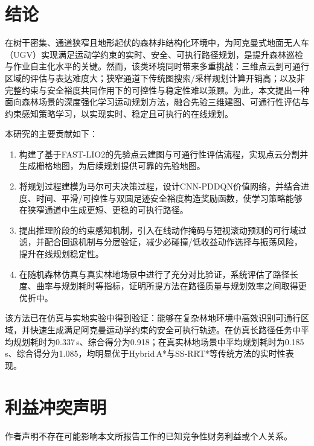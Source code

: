 \documentclass{iopjournal}
\begin{document}
\section{结论}\label{sec:conclusion}

在树干密集、通道狭窄且地形起伏的森林非结构化环境中，为阿克曼式地面无人车（UGV）实现满足运动学约束的实时、安全、可执行路径规划，是提升森林巡检与作业自主化水平的关键。然而，该类环境同时带来多重挑战：三维点云到可通行区域的评估与表达难度大；狭窄通道下传统图搜索/采样规划计算开销高；以及非完整约束与安全裕度共同作用下的可控性与稳定性难以兼顾。为此，本文提出一种面向森林场景的深度强化学习运动规划方法，融合先验三维建图、可通行性评估与约束感知策略学习，以实现实时、稳定且可执行的在线规划。

本研究的主要贡献如下：

\begin{enumerate}
  \item 构建了基于FAST-LIO2的先验点云建图与可通行性评估流程，实现点云分割并生成栅格地图，为后续规划提供可靠的先验地图。
  \item 将规划过程建模为马尔可夫决策过程，设计CNN-PDDQN价值网络，并结合进度、时间、平滑/可控性与双圆足迹安全裕度构造奖励函数，使学习策略能够在狭窄通道中生成更短、更稳的可执行路径。
  \item 提出推理阶段的约束感知机制，引入在线动作掩码与短视滚动预测的可行域过滤，并配合回退机制与分层验证，减少必碰撞/低收益动作选择与振荡风险，提升在线规划稳定性。
  \item 在随机森林仿真与真实林地场景中进行了充分对比验证，系统评估了路径长度、曲率与规划耗时等指标，证明所提方法在路径质量与规划效率之间取得更优折中。
\end{enumerate}

该方法已在仿真与实地实验中得到验证：能够在复杂林地环境中高效识别可通行区域，并快速生成满足阿克曼运动学约束的安全可执行轨迹。在仿真长路径任务中平均规划耗时为0.337\,s、综合得分为0.918；在真实林地场景中平均规划耗时为0.185\,s、综合得分为1.085，均明显优于Hybrid\,A*与SS-RRT*等传统方法的实时性表现。


\section*{利益冲突声明}

作者声明不存在可能影响本文所报告工作的已知竞争性财务利益或个人关系。



\end{document}
